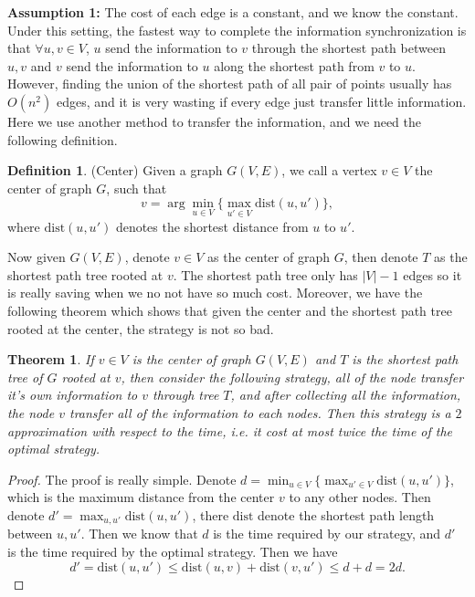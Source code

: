 \documentclass{article}
\theoremstyle{plain}
\newtheorem{thm}{Theorem}[section]
\theoremstyle{definition}
\newtheorem{defn}{Definition}[section]
\theoremstyle{remark}
\begin{document}
    \textbf{Assumption 1:} The cost of each edge is a constant, and we know the constant.\\
    
    Under this setting, the fastest way to complete the information synchronization is that $\forall u,v\in V$, $u$ send the information to $v$ through the shortest path between $u,v$ and $v$ send the information to $u$ along the shortest path from $v$ to $u$. However, finding the union of the shortest path of all pair of points usually has $O(n^2)$ edges, and it is very wasting if every edge just transfer little information.\\

    Here we use another method to transfer the information, and we need the following definition.

    \begin{defn}\label{center}
        (Center) Given a graph $G(V,E)$, we call a vertex $v\in V$ the center of graph $G$, such that
        \[v = \arg\min_{u\in V}\{\max_{u'\in V}\text{dist}(u,u')\},\]
        where $\text{dist}(u,u')$ denotes the shortest distance from $u$ to $u'$.
    \end{defn}

    Now given $G(V,E)$, denote $v\in V$ as the center of graph $G$, then denote $T$ as the shortest path tree rooted at $v$. The shortest path tree only has $|V|-1$ edges so it is really saving when we no not have so much cost. Moreover, we have the following theorem which shows that given the center and the shortest path tree rooted at the center, the strategy is not so bad.

    \begin{thm}
        If $v\in V$ is the center of graph $G(V,E)$ and $T$ is the shortest path tree of $G$ rooted at $v$, then consider the following strategy, all of the node transfer it's own information to $v$ through tree $T$, and after collecting all the information, the node $v$ transfer all of the information to each nodes. Then this strategy is a $2$ approximation with respect to the time, i.e. it cost at most twice the time of the optimal strategy.
    \end{thm}

    \begin{proof}
        The proof is really simple. Denote $d = \min_{u\in V}\{\max_{u'\in V}\text{dist}(u,u')\}$, which is the maximum distance from the center $v$ to any other nodes. Then denote $d' = \max_{u,u'}\text{dist}(u,u')$, there $\text{dist}$ denote the shortest path length between $u,u'$. Then we know that $d$ is the time required by our strategy, and $d'$ is the time required by the optimal strategy. Then we have
        \[d' = \text{dist}(u,u') \le \text{dist}(u,v) + \text{dist}(v,u') \le d + d = 2d.\]
    \end{proof}
\end{document}
